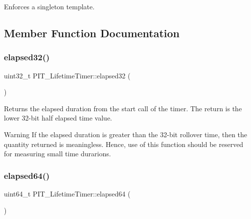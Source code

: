 Enforces a singleton template. 



\subsection{Member Function Documentation}
\mbox{\label{classPIT__LifetimeTimer_af7481214070333f845a23456b4d75880}} 
\subsubsection{\texorpdfstring{elapsed32()}{elapsed32()}}
{\footnotesize\ttfamily uint32\+\_\+t P\+I\+T\+\_\+\+Lifetime\+Timer\+::elapsed32 (\begin{DoxyParamCaption}{ }\end{DoxyParamCaption})\hspace{0.3cm}{\ttfamily [inline]}}



Returns the elapsed duration from the start call of the timer. The return is the lower 32-\/bit half elapsed time value. 

\begin{DoxyWarning}{Warning}
If the elapsed duration is greater than the 32-\/bit rollover time, then the quantity returned is meaningless. Hence, use of this function should be reserved for measuring small time durarions. 
\end{DoxyWarning}
\mbox{\label{classPIT__LifetimeTimer_a04adf2272a47d4c81a28c6363e2da4fd}} 
\subsubsection{\texorpdfstring{elapsed64()}{elapsed64()}}
{\footnotesize\ttfamily uint64\+\_\+t P\+I\+T\+\_\+\+Lifetime\+Timer\+::elapsed64 (\begin{DoxyParamCaption}{ }\end{DoxyParamCaption})\hspace{0.3cm}{\ttfamily [inline]}}




